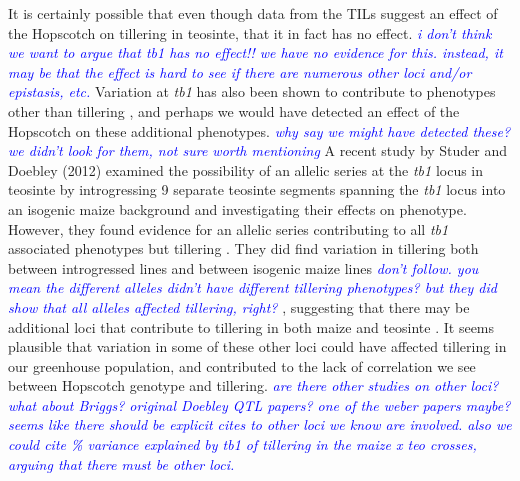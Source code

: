 \documentclass[12pt]{article}
\newcommand{\jri}[1]{\textcolor{blue}{ \emph{\scriptsize  #1}} }
\begin{document}
It is certainly possible that even though data from the TILs suggest an effect of the Hopscotch on tillering in teosinte, that it in fact has no effect. \jri{i don't think we want to argue that tb1 has no effect!! we have no evidence for this. instead, it may be that the effect is hard to see if there are numerous other loci and/or epistasis, etc.} Variation at \emph{tb1} has also been shown to contribute to phenotypes other than tillering \cite{Clark et al 2006}, and perhaps we would have detected an effect of the Hopscotch on these additional phenotypes. \jri{why say we might have detected these? we didn't look for them, not sure worth mentioning}  A recent study by Studer and Doebley (2012) examined the possibility of an allelic series at the \emph{tb1} locus in teosinte by introgressing 9 separate teosinte segments spanning the \emph{tb1} locus into an isogenic maize background and investigating their effects on phenotype. However, they found evidence for an allelic series contributing to all \emph{tb1} associated phenotypes but tillering . They did find variation in tillering both between introgressed lines and between isogenic maize lines \jri{don't follow. you mean the different alleles didn't have different tillering phenotypes? but they did show that all alleles affected tillering, right?}, suggesting that there may be additional loci that contribute to tillering in both maize and teosinte \cite{Studer and Doebley 2012}. It seems plausible that variation in some of these other loci could have affected tillering in our greenhouse population, and contributed to the lack of correlation we see between Hopscotch genotype and tillering. \jri{are there other studies on other loci? what about Briggs? original Doebley QTL papers? one of the weber papers maybe? seems like there should be explicit cites to other loci we know are involved.  also we could cite \% variance explained by tb1 of tillering in the maize x teo crosses, arguing that there must be other loci.}
\end{document}
